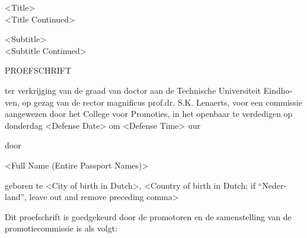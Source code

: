 \thispagestyle{empty}

\vspace*{2\bigskipamount}

\begin{center}

  {\huge%
    <Title>\\[0.3\baselineskip]%
    <Title Continued>}

  \vspace*{0.7\baselineskip}

  {%
    <Subtitle>\\[0.1\baselineskip]%
    <Subtitle Continued>}

  \vspace*{3.5\bigskipamount}

  {\large\scshape \textdutch{PROEFSCHRIFT}}

  \vspace*{3.5\bigskipamount}

  \begin{minipage}{\textwidth}
    \centering
    \begin{dutch}
      ter verkrijging van de graad van doctor aan de Technische Universiteit
      Eindhoven, op gezag van de rector magnificus prof.dr. S.K. Lenaerts, voor een
      commissie aangewezen door het College voor Promoties, in het openbaar te
      verdedigen op donderdag <Defense Date> om <Defense Time> uur
    \end{dutch}
  \end{minipage}%

  \vspace*{2.5\bigskipamount}

  \textdutch{door}

  \vspace*{2.5\bigskipamount}

  {%
     <Full Name (Entire Passport Names)>}

  \vspace*{2\bigskipamount}

  \textdutch{geboren te <City of birth in Dutch>, <Country of birth in Dutch; if ``Nederland'', leave out and remove preceding comma>}

\end{center}

\clearpage


\thispagestyle{empty}

\noindent
\begin{minipage}[t]{\textwidth}
  Dit proefschrift is goedgekeurd door de promotoren en de samenstelling van de
  promotiecommissie is als volgt:
\end{minipage}

